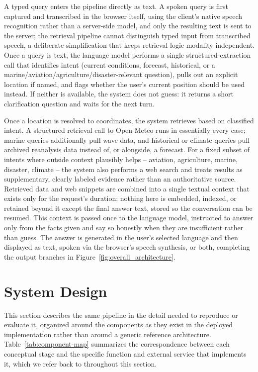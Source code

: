 \documentclass[sigconf,natbib=true,anonymous=true]{acmart}
\begin{document}
A typed query enters the pipeline directly as text. A spoken query is first captured and transcribed in the browser itself, using the client's native speech recognition rather than a server-side model, and only the resulting text is sent to the server; the retrieval pipeline cannot distinguish typed input from transcribed speech, a deliberate simplification that keeps retrieval logic modality-independent. Once a query is text, the language model performs a single structured-extraction call that identifies intent (current conditions, forecast, historical, or a marine/aviation/agriculture/disaster-relevant question), pulls out an explicit location if named, and flags whether the user's current position should be used instead. If neither is available, the system does not guess: it returns a short clarification question and waits for the next turn.

Once a location is resolved to coordinates, the system retrieves based on classified intent. A structured retrieval call to Open-Meteo runs in essentially every case; marine queries additionally pull wave data, and historical or climate queries pull archived reanalysis data instead of, or alongside, a forecast. For a fixed subset of intents where outside context plausibly helps -- aviation, agriculture, marine, disaster, climate -- the system also performs a web search and treats results as supplementary, clearly labeled evidence rather than an authoritative source. Retrieved data and web snippets are combined into a single textual context that exists only for the request's duration; nothing here is embedded, indexed, or retained beyond it except the final answer text, stored so the conversation can be resumed. This context is passed once to the language model, instructed to answer only from the facts given and say so honestly when they are insufficient rather than guess. The answer is generated in the user's selected language and then displayed as text, spoken via the browser's speech synthesis, or both, completing the output branches in Figure~\ref{fig:overall_architecture}.

\section{System Design}
\label{sec:sysdesign}

This section describes the same pipeline in the detail needed to reproduce or evaluate it, organized around the components as they exist in the deployed implementation rather than around a generic reference architecture. Table~\ref{tab:component-map} summarizes the correspondence between each conceptual stage and the specific function and external service that implements it, which we refer back to throughout this section.
\end{document}
